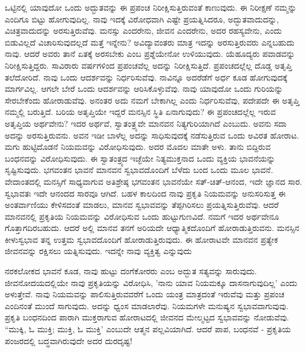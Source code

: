 ಒಟ್ಟಿನಲ್ಲಿ ಯಾವುದೋ ಒಂದು ಅದ್ಭುತವನ್ನು ಈ ಪ್ರಪಂಚ ನಿರೀಕ್ಷಿಸುತ್ತಿರುವಂತೆ ಕಾಣುವುದು. ಈ ನಿರೀಕ್ಷಣೆ ನಮ್ಮನ್ನು ಎಂದಿಗೂ ಬಿಟ್ಟು ಹೋಗುವುದಿಲ್ಲ. ನಾವು ಇದಕ್ಕೆ ವಿರೋಧವಾಗಿ ಎಷ್ಟೇ ಪ್ರಯತ್ನಿಸಿದರೂ, ಅದ್ಭುತವಾದುದನ್ನು, ವಿಚಿತ್ರವಾದುದನ್ನು ಅರಸುತ್ತಿರುವೆವು. ಮನಸ್ಸು ಎಂದರೇನು, ಜೀವನ ಎಂದರೇನು, ಅದರ ರಹಸ್ಯವೇನು, ಎಂದು ಬಿಡುವಿಲ್ಲದೆ ವಿಚಾರಿಸುವುದಲ್ಲದೆ ಮತ್ತೆ ಇನ್ನೇನು? ಅವಿದ್ಯಾವಂತರು ಮಾತ್ರ ಇದನ್ನು ಅರಸುತ್ತಿರುವರು ಎನ್ನಬಹುದು ನಾವು. ಆದರೆ ಅವರು ತಾನೆ ಏತಕ್ಕೆ ಅರಸಬೇಕು ಎಂಬ ಪ್ರಶ್ನೆಯೇನೋ ಉಳಿಯುವುದು. ಯೆಹೂದ್ಯರು ಪವಾಡವನ್ನು ನಿರೀಕ್ಷಿಸುತ್ತಿದ್ದರು. ಸಾವಿರಾರು ವರ್ಷಗಳಿಂದ ಪ್ರಪಂಚವೆಲ್ಲ ಅದನ್ನು ನಿರೀಕ್ಷಿಸುತ್ತಿದೆ. ಪ್ರಪಂಚದಲ್ಲೆಲ್ಲ ದೊಡ್ಡ ಅತೃಪ್ತಿ ತಲೆದೋರಿದೆ. ನಾವು ಒಂದು ಆದರ್ಶವನ್ನು ನಿರ್ಧರಿಸುವೆವು. ನಾವಿನ್ನೂ ಅದರೆಡೆಗೆ ಅರ್ಧ ಕೂಡ ಹೋಗುವುದಕ್ಕೆ ಮಾರ್ಗವಿಲ್ಲ. ಆಗಲೇ ಬೇರೆ ಒಂದು ಆದರ್ಶವನ್ನು ಆರಿಸಿಕೊಳ್ಳುವೆವು. ನಾವು ಯಾವುದೋ ಒಂದು ಗುರಿಯನ್ನು ಸೇರಬೇಕೆಂದು ಹೋರಾಡುವೆವು. ಅನಂತರ ಅದು ನಮಗೆ ಬೇಕಾಗಿಲ್ಲ ಎಂದು ನಿರ್ಧರಿಸುವೆವು, ಪದೇಪದೇ ಈ ಅತೃಪ್ತಿ ನಮ್ಮಲ್ಲಿ ಬರುತ್ತಿದೆ. ಬರಿಯ ಅತೃಪ್ತಿಯೇ ಇದ್ದರೆ ಮನಸ್ಸಿನ ಸ್ಥಿತಿ ಏನಾಗುವುದು? ಈ ಪ್ರಪಂಚದಲ್ಲೆಲ್ಲ ಇರುವ ಅತೃಪ್ತಿಯ ಅರ್ಥವೇನು? ಇದರ ಅರ್ಥವೆ, ಸ್ವಾತಂತ್ರ್ಯವೇ ಮಾನವನ ನಿತ್ಯಗುರಿಯಾಗಿದೆ ಎಂಬುದು. ಅವನು ಸದಾ ಅದನ್ನು ಅರಸುತ್ತಿರುವನು. ಅವನ ಇಡೀ ಬಾಳೆಲ್ಲ ಅದನ್ನು ಸಾಧಿಸುವುದಕ್ಕೆ ನಡೆಸುತ್ತಿರುವ ಒಂದು ಅವಿರತ ಹೋರಾಟ. ಮಗು ಹುಟ್ಟಿದೊಡನೆ ನಿಯಮವನ್ನು ವಿರೋಧಿಸುವುದು. ಅದರ ಮೊದಲ ಮಾತೇ ಅಳು. ತಾನು ಬಿದ್ದಿರುವ ಬಂಧನವನ್ನು ವಿರೋಧಿಸುವುದು. ಈ ಸ್ವಾತಂತ್ರ್ಯದ ಇಚ್ಛೆಯೇ ನಿತ್ಯಮುಕ್ತನಾದ ಒಂದು ವ್ಯಕ್ತಿಯ ಭಾವನೆಯನ್ನು ಸೃಷ್ಟಿಸುವುದು. ಭಗವಂತನ ಭಾವನೆ ಮಾನವನ ಸ್ವಭಾವದೊಂದಿಗೆ ಬೆಳೆದು ಬಂದ ಒಂದು ಮೂಲ ಭಾವನೆ. ವೇದಾಂತದಲ್ಲಿ ಮನಸ್ಸಿಗೆ ಸಾಧ್ಯವಾಗುವ ಅತಿಶ್ರೇಷ್ಠ ಭಗವಂತನ ಭಾವನೆಯೇ ಸತ್-ಚಿತ್-ಆನಂದ, ಇದೇ ಜ್ಞಾನದ ಸಾರ. ಸ್ವಭಾವತಃ ಇದೇ ಆನಂದದ ಸಾರವೂ ಆಗಿದೆ. ಬಹಳ ಕಾಲದಿಂದ ನಾವು ಪ್ರಕೃತಿ ನಿಯಮವನ್ನು ಅನುಸರಿಸುತ್ತ ಈ ಅಂತರ್ವಾಣಿಯು ಕೇಳಿಸದಂತೆ ಮಾಡಲು, ಮಾನವ ಸ್ವಭಾವವನ್ನು ತೆಪ್ಪಗಿರಿಸಲು ಪ್ರಯತ್ನಿಸುತ್ತಿರುವೆವು. ಆದರೆ ಮಾನವನಲ್ಲಿ ಪ್ರಕೃತಿಯ ನಿಯಮವನ್ನು ವಿರೋಧಿಸುವ ಒಂದು ಹುಟ್ಟುಗುಣವಿದೆ. ನಮಗೆ ಇದರ ಅರ್ಥವೇನೂ ಗೊತ್ತಾಗದಿರಬಹುದು. ಆದರೆ ಅಲ್ಲಿ ಮಾನವ ತನಗೆ ಅರಿಯದೇ ಆಧ್ಯಾತ್ಮಿಕದೊಂದಿಗೆ ಹೋರಾಡುತ್ತಿರುವನು. ಮನಸ್ಸಿನ ಕೀಳುಸ್ವಭಾವ ತನ್ನ ಉತ್ತಮ ಸ್ವಭಾವದೊಂದಿಗೆ ಹೋರಾಡುತ್ತಿರುವುದು. ಈ ಹೋರಾಟವೇ ಮಾನವನ ಪ್ರತ್ಯೇಕ ಜೀವನವನ್ನು ರಕ್ಷಿಸಲು ಯತ್ನಿಸುವುದು. ಇದನ್ನೇ ನಾವು ವ್ಯಕ್ತಿತ್ವ ಎನ್ನುವುದು

ನರಕಲೋಕದ ಭಾವನೆ ಕೂಡ, ನಾವು ಹುಟ್ಟು ದಂಗೆಕೋರರು ಎಂಬ ಅದ್ಭುತ ಸತ್ಯವನ್ನು ಸಾರುವುದು. ಜೀವನೋದಯದಲ್ಲಿಯೇ ನಾವು ಪ್ರಕೃತಿಯನ್ನು ವಿರೋಧಿಸಿ, 'ನಾನು ಯಾವ ನಿಯಮಕ್ಕೂ ದಾಸನಾಗುವುದಿಲ್ಲ' ಎಂದು ಅಳುತ್ತೇವೆ. ನಾವು ನಿಯಮವನ್ನು ಪಾಲಿಸುತ್ತಿರುವವರೆಗೆ ಒಂದು ಯಂತ್ರ ಮಾತ್ರದಂತೆ ಇರುವೆವು ಮತ್ತು ಪ್ರಪಂಚ ಎಂದಿನಂತೆ ಮುಂದೆ ಸಾಗುವುದು. ಅದನ್ನು ಧ್ವಂಸ ಮಾಡಲಾರೆವು. ನಿಯಮಗಳೇ ಮನುಷ್ಯನ ಸ್ವಭಾವವಾಗುವುವು. ಪ್ರಕೃತಿ ಬಂಧನದಿಂದ ಪಾರಾಗಿ ಮುಕ್ತರಾಗುವ ಹೋರಾಟದಲ್ಲಿ ಜೀವನದ ಮೇಲ್ಮಟ್ಟದ ಸ್ವಭಾವವನ್ನು ನೋಡುವೆವು. “ಮುಕ್ಕಿ, ಓ ಮುಕ್ತಿ; ಮುಕ್ತಿ, ಓ ಮುಕ್ತಿ' ಎಂಬುದೇ ಆತ್ಮನ ಪಲ್ಲವಿಯಾಗಿದೆ. ಆದರೆ ಪಾಪ, ಬಂಧನವೆ - ಪ್ರಕೃತಿಯ ಪಂಜರದಲ್ಲಿ ಬದ್ಧವಾಗಿರುವುದೇ ಅದರ ದುರದೃಷ್ಟ!

